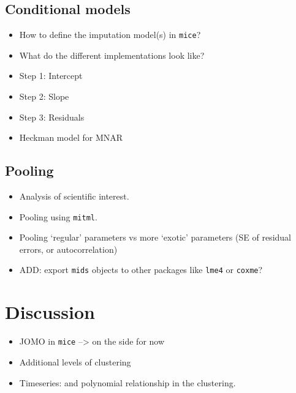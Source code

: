 \documentclass[
]{jss}
\begin{document}
\hypertarget{conditional-models}{%
\subsection{Conditional models}\label{conditional-models}}

\begin{itemize}
\item
  How to define the imputation model(s) in \texttt{mice}?
\item
  What do the different implementations look like?
\item
  Step 1: Intercept
\item
  Step 2: Slope
\item
  Step 3: Residuals
\item
  Heckman model for MNAR
\end{itemize}

\hypertarget{pooling}{%
\subsection{Pooling}\label{pooling}}

\begin{itemize}
\item
  Analysis of scientific interest.
\item
  Pooling using \texttt{mitml}.
\item
  Pooling `regular' parameters vs more `exotic' parameters (SE of
  residual errors, or autocorrelation)
\item
  ADD: export \texttt{mids} objects to other packages like \texttt{lme4}
  or \texttt{coxme}?
\end{itemize}

\hypertarget{discussion}{%
\section{Discussion}\label{discussion}}

\begin{itemize}
\item
  JOMO in \texttt{mice} --\textgreater{} on the side for now
\item
  Additional levels of clustering
\item
  Timeseries: and polynomial relationship in the clustering.
\end{itemize}

\renewcommand\refname{References}

\end{document}
